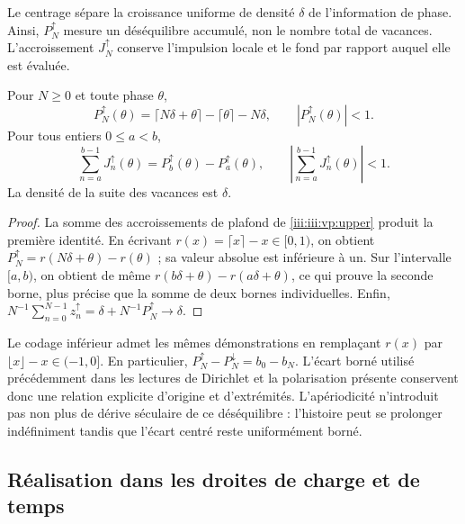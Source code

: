 Le centrage sépare la croissance uniforme de densité $\delta$ de
l’information de phase. Ainsi, $P_N^{\uparrow}$ mesure un déséquilibre accumulé,
non le nombre total de vacances. L’accroissement $J_N^{\uparrow}$ conserve
l’impulsion locale et le fond par rapport auquel elle est évaluée.

\begin{theorem}
Pour $N\geq0$ et toute phase $\theta$,
\begin{equation}
 P_N^{\uparrow}(\theta)
 =\lceil N\delta+\theta\rceil-\lceil\theta\rceil-N\delta,
 \qquad |P_N^{\uparrow}(\theta)|<1.
 \label{iii:iii:vp:bound}
\end{equation}
Pour tous entiers $0\leq a<b$,
\begin{equation}
 \sum_{n=a}^{b-1}J_n^{\uparrow}(\theta)
 =P_b^{\uparrow}(\theta)-P_a^{\uparrow}(\theta),
 \qquad
 \left|\sum_{n=a}^{b-1}J_n^{\uparrow}(\theta)\right|<1.
 \label{iii:iii:vp:continuity}
\end{equation}
La densité de la suite des vacances est $\delta$.
\end{theorem}
\begin{proof}
La somme des accroissements de plafond de \eqref{iii:iii:vp:upper} produit la première identité. En écrivant $r(x)=\lceil x\rceil-x\in[0,1)$, on obtient $P_N^{\uparrow}=r(N\delta+\theta)-r(\theta)$ ; sa valeur absolue est inférieure à un. Sur l'intervalle $[a,b)$, on obtient de même $r(b\delta+\theta)-r(a\delta+\theta)$, ce qui prouve la seconde borne, plus précise que la somme de deux bornes individuelles. Enfin, $N^{-1}\sum_{n=0}^{N-1}z_n^{\uparrow}
=\delta+N^{-1}P_N^{\uparrow}\to\delta$.
\end{proof}

Le codage inférieur admet les mêmes démonstrations en remplaçant
$r(x)$ par $\lfloor x\rfloor-x\in(-1,0]$. En particulier,
$P_N^{\uparrow}-P_N^{\downarrow}=b_0-b_N$. L’écart borné
utilisé précédemment dans les lectures de Dirichlet et la polarisation
présente conservent donc une relation explicite d’origine et d’extrémités.
L’apériodicité n’introduit pas non plus de dérive séculaire de ce déséquilibre :
l’histoire peut se prolonger indéfiniment tandis que l’écart
centré reste uniformément borné.

\subsection{Réalisation dans les droites de charge et de temps}

